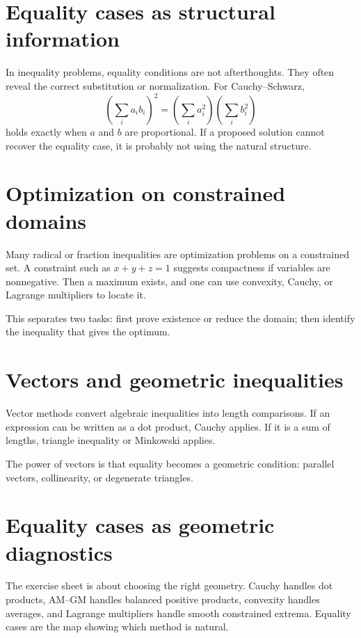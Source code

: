 \section{Equality cases as structural information}

In inequality problems, equality conditions are not afterthoughts.  They often reveal the correct substitution or normalization.  For Cauchy--Schwarz,
\[
  \left(\sum_i a_i b_i\right)^2=\left(\sum_i a_i^2\right)\left(\sum_i b_i^2\right)
\]
holds exactly when \(a\) and \(b\) are proportional.  If a proposed solution cannot recover the equality case, it is probably not using the natural structure.

\section{Optimization on constrained domains}

Many radical or fraction inequalities are optimization problems on a constrained set.  A constraint such as \(x+y+z=1\) suggests compactness if variables are nonnegative.  Then a maximum exists, and one can use convexity, Cauchy, or Lagrange multipliers to locate it.

This separates two tasks: first prove existence or reduce the domain; then identify the inequality that gives the optimum.

\section{Vectors and geometric inequalities}

Vector methods convert algebraic inequalities into length comparisons.  If an expression can be written as a dot product, Cauchy applies.  If it is a sum of lengths, triangle inequality or Minkowski applies.

The power of vectors is that equality becomes a geometric condition: parallel vectors, collinearity, or degenerate triangles.

\section{Equality cases as geometric diagnostics}

The exercise sheet is about choosing the right geometry.  Cauchy handles dot products, AM--GM handles balanced positive products, convexity handles averages, and Lagrange multipliers handle smooth constrained extrema.  Equality cases are the map showing which method is natural.

